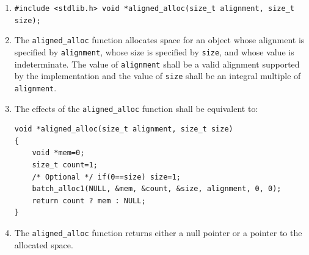 \documentclass[wd]{isov2}
\begin{document}
{
\begin{enumerate}
\renewcommand{\theenumi}{\arabic{enumi}}
\item \texttt{\#include <stdlib.h>\linebreak
void *aligned\_alloc(size\_t alignment, size\_t size);}
\item The \texttt{aligned\_alloc} function allocates space for an object whose alignment is specified by \texttt{alignment}, whose size is specified by \texttt{size}, and whose value is indeterminate. The value of \texttt{alignment} shall be a valid alignment supported by the implementation and the value of \texttt{size} shall be an integral multiple of \texttt{alignment}.
\color{changed}
\item The effects of the \texttt{aligned\_alloc} function shall be equivalent to:
\begin{verbatim}
void *aligned_alloc(size_t alignment, size_t size)
{
    void *mem=0;
    size_t count=1;
    /* Optional */ if(0==size) size=1;
    batch_alloc1(NULL, &mem, &count, &size, alignment, 0, 0);
    return count ? mem : NULL;
}
\end{verbatim}
\color{black}
\item The \texttt{aligned\_alloc} function returns either a null pointer or a pointer to the allocated space.
\end{enumerate}

}
\end{document}
